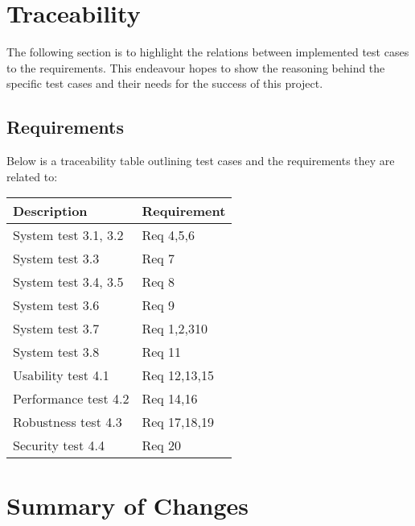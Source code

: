 \documentclass[12pt]{article}
\begin{document}
\section{Traceability}
The following section is to highlight the relations between  implemented test cases to the requirements. This endeavour hopes to show the reasoning behind the specific test cases and their needs for the success of this project. 

\subsection{Requirements}
Below is a traceability table outlining test cases and the requirements they are related to:\\

\begin{table}
\centering
\begin{tabularx}{0.7\textwidth}{p{4cm}X}
\toprule{\bf Description} & {\bf Requirement}\\
\midrule
System test 3.1, 3.2 & Req 4,5,6\\
System test 3.3 & Req 7\\
System test 3.4, 3.5 & Req 8\\
System test 3.6 & Req 9\\
System test 3.7 & Req 1,2,310\\
System test 3.8 & Req 11\\
Usability test 4.1 & Req 12,13,15\\
Performance test 4.2 & Req 14,16\\
Robustness test 4.3 & Req 17,18,19\\
Security test 4.4 & Req 20\\
\bottomrule
\end{tabularx}
\end{table}
\newpage

\section{Summary of Changes}
\end{document}
